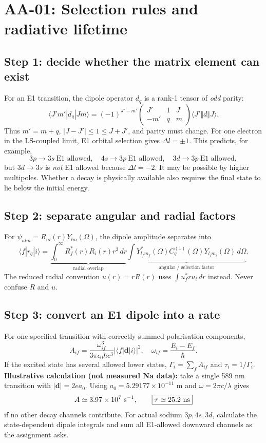 
\section{AA-01: Selection rules and radiative lifetime}
\subsection*{Step 1: decide whether the matrix element can exist}
For an E1 transition, the dipole operator \(d_q\)
is a rank-1 tensor of \emph{odd} parity:
\[
\langle J'm'|d_q|Jm\rangle=
(-1)^{J'-m'}
\begin{pmatrix}J'&1&J\\-m'&q&m\end{pmatrix}
\langle J'\Vert d\Vert J\rangle .
\]
Thus \(m'=m+q\), \(|J-J'|\le1\le J+J'\),
and parity must change. For one electron in the
LS-coupled limit, E1 orbital selection gives
\(\Delta l=\pm1\). This predicts, for example,
\[
3p\to3s\ \text{E1 allowed},\quad
4s\to3p\ \text{E1 allowed},\quad
3d\to3p\ \text{E1 allowed},
\]
but \(3d\to3s\) is \emph{not} E1 allowed because
\(\Delta l=-2\). It may be possible by higher multipoles.
Whether a decay is physically available also requires
the final state to lie below the initial energy.

\subsection*{Step 2: separate angular and radial factors}
For \(\psi_{nlm}=R_{nl}(r)Y_{lm}(\Omega)\),
the dipole amplitude separates into
\[
\langle f|r_q|i\rangle=
\underbrace{\int_0^\infty
R_f^*(r)R_i(r)r^3\,dr}_{\text{radial overlap}}\!
\underbrace{\int Y_{l_fm_f}^*(\Omega)
C_q^{(1)}(\Omega)Y_{l_im_i}(\Omega)\,d\Omega}_{
\text{angular / selection factor}} .
\]
The reduced radial convention \(u(r)=rR(r)\)
uses \(\int u_f^*r u_i\,dr\) instead.
Never confuse \(R\) and \(u\).

\subsection*{Step 3: convert an E1 dipole into a rate}
For one specified transition with correctly summed
polarisation components,
\[
\boxed{A_{if}=\frac{\omega_{if}^3}{3\pi\epsilon_0\hbar c^3}
|\langle f|\mathbf d|i\rangle|^2},\quad
\omega_{if}=\frac{E_i-E_f}{\hbar}.
\]
If the excited state has several allowed lower states,
\(\Gamma_i=\sum_f A_{if}\) and
\(\boxed{\tau_i=1/\Gamma_i}\).
\textbf{Illustrative calculation (not measured Na data):}
take a single 589 nm transition with
\(|\mathbf d|=2ea_0\). Using
\(a_0=5.29177\times10^{-11}\) m and
\(\omega=2\pi c/\lambda\) gives
\[
A\simeq3.97\times10^7\ {\rm s}^{-1},\qquad
\boxed{\tau\simeq25.2\ {\rm ns}}
\]
if no other decay channels contribute.
For actual sodium \(3p,4s,3d\), calculate the
state-dependent dipole integrals and sum all
E1-allowed downward channels as the assignment asks.

